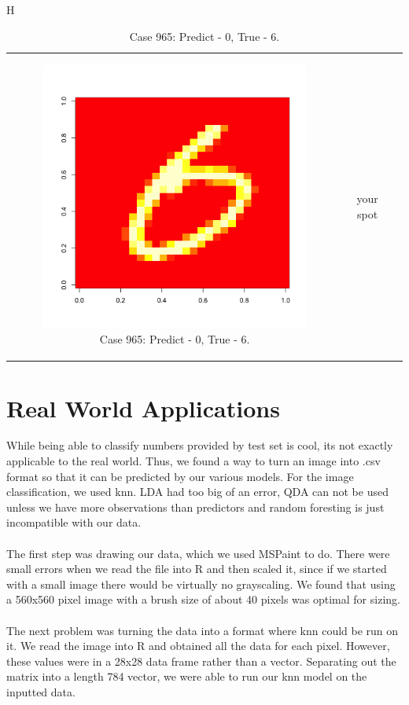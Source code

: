 \documentclass[10pt]{extarticle}
\begin{document}
\begin{table}{H}
\begin{tabular}{c c c}
\begin{subfigure}{0.3\textwidth}\centering\includegraphics[scale = .25]{../Images/965.png}\caption{Case 965: Predict - 0, True - 6.}\label{fig:taba}\end{subfigure}&
your spot
\end{tabular}
\end{table}


\section{Real World Applications}

While being able to classify numbers provided by test set is cool, its not exactly applicable to the real world. Thus, we found a way to turn an image into .csv format so that it can be predicted by our various models. For the image classification, we used knn. LDA had too big of an error, QDA can not be used unless we have more observations than predictors and random foresting is just incompatible with our data.\\\\
The first step was drawing our data, which we used MSPaint to do. There were small errors when we read the file into R and then scaled it, since if we started with a small image there would be virtually no grayscaling. We found that using a 560x560 pixel image with a brush size of about 40 pixels was optimal for sizing.\\\\
The next problem was turning the data into a format where knn could be run on it. We read the image into R and obtained all the data for each pixel. However, these values were in a 28x28 data frame rather than a vector. Separating out the matrix into a length 784 vector, we were able to run our knn model on the inputted data.
\end{document}
